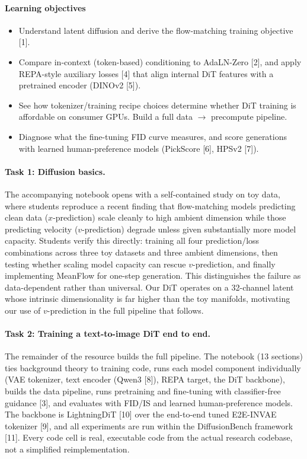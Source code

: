 \documentclass{article}
\begin{document}
\paragraph{Learning objectives}
\begin{itemize}
  \item Understand latent diffusion and derive the flow-matching training objective [1].
  \item Compare in-context (token-based) conditioning to AdaLN-Zero [2], and apply
    REPA-style auxiliary losses [4] that align internal DiT features with a pretrained encoder (DINOv2 [5]).
  \item See how tokenizer/training recipe choices determine whether DiT training is
    affordable on consumer GPUs. Build a full data $\to$ precompute pipeline.
  \item Diagnose what the fine-tuning FID curve measures, and score generations with
    learned human-preference models (PickScore [6], HPSv2 [7]).
\end{itemize}

\vspace{-0.2em}
\paragraph{Task 1: Diffusion basics.} The accompanying notebook opens with a self-contained study on toy data, where students reproduce a recent finding that flow-matching models predicting clean data ($x$-prediction) scale cleanly to high ambient dimension while those predicting velocity ($v$-prediction) degrade unless given substantially more model capacity. Students verify this directly: training all four prediction/loss combinations across three toy datasets and three ambient dimensions, then testing whether scaling model capacity can rescue $v$-prediction, and finally implementing MeanFlow for one-step generation. This distinguishes the failure as data-dependent rather than universal. Our DiT operates on a 32-channel latent whose intrinsic dimensionality is far higher than the toy manifolds, motivating our use of $v$-prediction in the full pipeline that follows.

\paragraph{Task 2: Training a text-to-image DiT end to end.} The remainder of the resource builds the full pipeline. The notebook (13 sections) ties background
theory to training code, runs each model component individually (VAE tokenizer, text encoder (Qwen3 [8]), REPA target, the DiT backbone), builds the data pipeline, runs pretraining and
fine-tuning with classifier-free guidance [3], and evaluates with FID/IS and learned human-preference models. The backbone is LightningDiT [10] over the end-to-end tuned E2E-INVAE tokenizer [9], and all experiments are run within the DiffusionBench framework [11]. Every code cell
is real, executable code from the actual research codebase, not a simplified
reimplementation.
\end{document}

